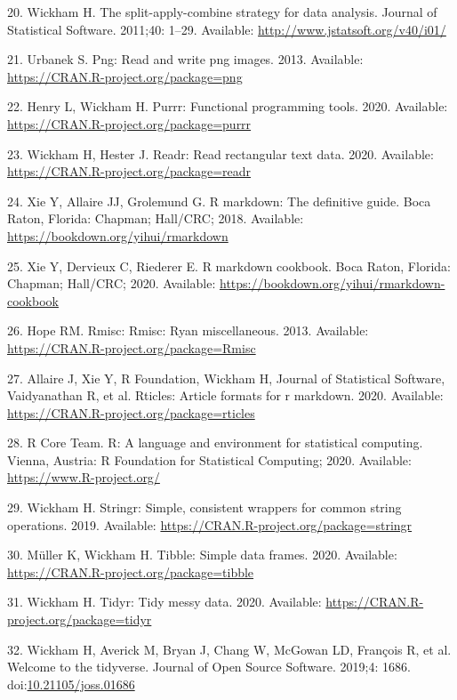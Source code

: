 \documentclass[10pt,letterpaper]{article}
\begin{document}
\leavevmode\hypertarget{ref-R-plyr}{}%
20. Wickham H. The split-apply-combine strategy for data analysis. Journal of Statistical Software. 2011;40: 1--29. Available: \url{http://www.jstatsoft.org/v40/i01/}

\leavevmode\hypertarget{ref-R-png}{}%
21. Urbanek S. Png: Read and write png images. 2013. Available: \url{https://CRAN.R-project.org/package=png}

\leavevmode\hypertarget{ref-R-purrr}{}%
22. Henry L, Wickham H. Purrr: Functional programming tools. 2020. Available: \url{https://CRAN.R-project.org/package=purrr}

\leavevmode\hypertarget{ref-R-readr}{}%
23. Wickham H, Hester J. Readr: Read rectangular text data. 2020. Available: \url{https://CRAN.R-project.org/package=readr}

\leavevmode\hypertarget{ref-R-rmarkdown_a}{}%
24. Xie Y, Allaire JJ, Grolemund G. R markdown: The definitive guide. Boca Raton, Florida: Chapman; Hall/CRC; 2018. Available: \url{https://bookdown.org/yihui/rmarkdown}

\leavevmode\hypertarget{ref-R-rmarkdown_b}{}%
25. Xie Y, Dervieux C, Riederer E. R markdown cookbook. Boca Raton, Florida: Chapman; Hall/CRC; 2020. Available: \url{https://bookdown.org/yihui/rmarkdown-cookbook}

\leavevmode\hypertarget{ref-R-Rmisc}{}%
26. Hope RM. Rmisc: Rmisc: Ryan miscellaneous. 2013. Available: \url{https://CRAN.R-project.org/package=Rmisc}

\leavevmode\hypertarget{ref-R-rticles}{}%
27. Allaire J, Xie Y, R Foundation, Wickham H, Journal of Statistical Software, Vaidyanathan R, et al. Rticles: Article formats for r markdown. 2020. Available: \url{https://CRAN.R-project.org/package=rticles}

\leavevmode\hypertarget{ref-R-splines}{}%
28. R Core Team. R: A language and environment for statistical computing. Vienna, Austria: R Foundation for Statistical Computing; 2020. Available: \url{https://www.R-project.org/}

\leavevmode\hypertarget{ref-R-stringr}{}%
29. Wickham H. Stringr: Simple, consistent wrappers for common string operations. 2019. Available: \url{https://CRAN.R-project.org/package=stringr}

\leavevmode\hypertarget{ref-R-tibble}{}%
30. Müller K, Wickham H. Tibble: Simple data frames. 2020. Available: \url{https://CRAN.R-project.org/package=tibble}

\leavevmode\hypertarget{ref-R-tidyr}{}%
31. Wickham H. Tidyr: Tidy messy data. 2020. Available: \url{https://CRAN.R-project.org/package=tidyr}

\leavevmode\hypertarget{ref-R-tidyverse}{}%
32. Wickham H, Averick M, Bryan J, Chang W, McGowan LD, François R, et al. Welcome to the tidyverse. Journal of Open Source Software. 2019;4: 1686. doi:\href{https://doi.org/10.21105/joss.01686}{10.21105/joss.01686}

\endgroup

\nolinenumbers
\end{document}
